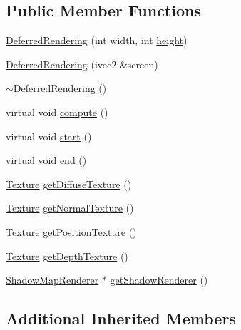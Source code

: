 \subsection*{Public Member Functions}
\begin{DoxyCompactItemize}
\item 
\hyperlink{class_agmd_1_1_deferred_rendering_aa0340565cc8696ac71e70d630da629c3}{Deferred\+Rendering} (int width, int \hyperlink{_examples_2_bezier_2_app_8cpp_a48083b65ac9a863566dc3e3fff09a5b4}{height})
\item 
\hyperlink{class_agmd_1_1_deferred_rendering_a89f5f132a638725ae177a5c06d0f0d57}{Deferred\+Rendering} (ivec2 \&screen)
\item 
\hyperlink{class_agmd_1_1_deferred_rendering_aa7821dbe9add97724da5abe3754c2610}{$\sim$\+Deferred\+Rendering} ()
\item 
virtual void \hyperlink{class_agmd_1_1_deferred_rendering_a515c1e13b229417261fa43f77e594076}{compute} ()
\item 
virtual void \hyperlink{class_agmd_1_1_deferred_rendering_ac6aaad52470c21daebdb59855e201b34}{start} ()
\item 
virtual void \hyperlink{class_agmd_1_1_deferred_rendering_aaa09f668d35aea7fb30c940fd658f733}{end} ()
\item 
\hyperlink{class_agmd_1_1_texture}{Texture} \hyperlink{class_agmd_1_1_deferred_rendering_a58b92c863aec0b8167f91b7516d78a7e}{get\+Diffuse\+Texture} ()
\item 
\hyperlink{class_agmd_1_1_texture}{Texture} \hyperlink{class_agmd_1_1_deferred_rendering_a0aeb24cbe4df29cc7b7f6c96f453b5e7}{get\+Normal\+Texture} ()
\item 
\hyperlink{class_agmd_1_1_texture}{Texture} \hyperlink{class_agmd_1_1_deferred_rendering_ac745410438f12bc277f5098c912ca06f}{get\+Position\+Texture} ()
\item 
\hyperlink{class_agmd_1_1_texture}{Texture} \hyperlink{class_agmd_1_1_deferred_rendering_a6f06e52e67926947ae6c045f8e9ff2ac}{get\+Depth\+Texture} ()
\item 
\hyperlink{class_agmd_1_1_shadow_map_renderer}{Shadow\+Map\+Renderer} $\ast$ \hyperlink{class_agmd_1_1_deferred_rendering_a871cc35ee2e38a1865779fbc6889188b}{get\+Shadow\+Renderer} ()
\end{DoxyCompactItemize}
\subsection*{Additional Inherited Members}


